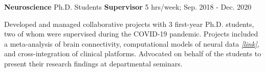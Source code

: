 \begin{cventries}
  \cventry
  	{\textbf{Neuroscience}}
    {Ph.D. Students} %
    {\textbf{Supervisor}}
    {5 hrs/week; Sep. 2018 - Dec. 2020} %
   {
      \begin{cvitems} %
        \item {Developed and managed collaborative projects with 3 first-year Ph.D. students, two of whom were supervised during the COVID-19 pandemic. Projects included a meta-analysis of brain connectivity, computational models of neural data {\href{https://docs.google.com/presentation/d/1KqypbxIWP9h1bFufipUan3MAQW_0ZS7i/edit?usp=sharing&ouid=110847987931723045299&rtpof=true&sd=true}{\textit{[link]}}}, and cross-integration of clinical platforms. Advocated on behalf of the students to present their research findings at departmental seminars}. 
      \end{cvitems}
    }
    

\end{cventries}
